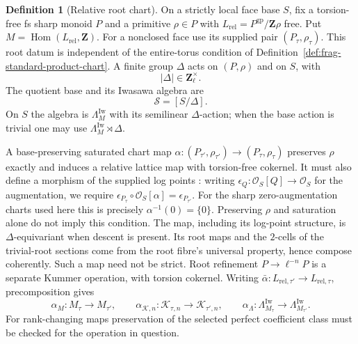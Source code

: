 \documentclass[11pt]{article}
\theoremstyle{definition}
\newtheorem{definition}[theorem]{Definition}
\theoremstyle{remark}
\begin{document}
\begin{definition}[Relative root chart]
\label{def:frag-root-presented-chart}
On a strictly local face base $S$, fix a torsion-free fs sharp monoid
$P$ and a primitive $\rho\in P$ with
$L_{\mathrm{rel}}=P^{\mathrm{gp}}/\mathbf Z\rho$ free.  Put
$M=\operatorname{Hom}(L_{\mathrm{rel}},\mathbf Z)$.
For a nonclosed face use its supplied pair $(P_\tau,\rho_\tau)$.
This root datum is independent of the entire-torus condition of
Definition~\ref{def:frag-standard-product-chart}.
A finite group $\Delta$ acts on $(P,\rho)$ and on $S$, with
\begin{equation}
 |\Delta|\in\mathbf Z_\ell^\times.
 \label{eq:frag-delta-prime-to-ell}
\end{equation}
The quotient base and its Iwasawa algebra are
\begin{equation}
 \mathscr S=[S/\Delta].
 \label{eq:frag-quotient-base}
\end{equation}
On $S$ the algebra is $\Lambda_M^{\mathrm{Iw}}$ with its semilinear
$\Delta$-action; when the base action is trivial one may use
$\Lambda_M^{\mathrm{Iw}}\rtimes\Delta$.

A base-preserving saturated chart map
$\alpha:(P_{\tau'},\rho_{\tau'})\to(P_\tau,\rho_\tau)$ preserves $\rho$
exactly and induces a relative lattice map with torsion-free cokernel.
It must also define a morphism of the supplied log points
\cite[\S1.2]{FujiwaraKatoNakayama}: writing
$\epsilon_Q:\mathcal O_S[Q]\to\mathcal O_S$ for the augmentation,
we require $\epsilon_{P_\tau}\circ\mathcal O_S[\alpha]
=\epsilon_{P_{\tau'}}$.  For the sharp zero-augmentation charts used
here this is precisely $\alpha^{-1}(0)=\{0\}$.
Preserving $\rho$ and saturation alone do not imply this condition.
The map, including its log-point structure, is $\Delta$-equivariant
when descent is present.  Its root maps
and the $2$-cells of the trivial-root sections come from the root
fibre's universal property, hence compose coherently.  Such a map
need not be strict.  Root refinement $P\to\ell^{-n}P$ is a separate
Kummer operation, with torsion cokernel.
Writing $\bar\alpha:L_{\mathrm{rel},\tau'}\to L_{\mathrm{rel},\tau}$,
precomposition gives
\begin{equation}
 \alpha_M:M_\tau\to M_{\tau'},\qquad
 \alpha_{\mathcal K,n}:\mathcal K_{\tau,n}\to\mathcal K_{\tau',n},\qquad
 \alpha_\Lambda:\Lambda_{M_\tau}^{\mathrm{Iw}}
                   \to\Lambda_{M_{\tau'}}^{\mathrm{Iw}}.
 \label{eq:frag-chart-variance}
\end{equation}
For rank-changing maps preservation of the selected perfect
coefficient class must be checked for the operation in question.


\end{definition}
\end{document}
